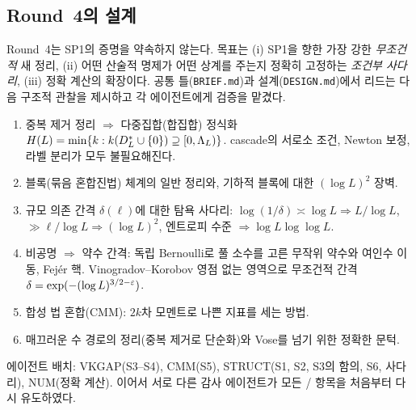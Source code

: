\subsection{Round~4의 설계}
Round~4는 SP1의 증명을 약속하지 않는다. 목표는 (i) SP1을 향한 가장 강한 \emph{무조건적} 새 정리, (ii) 어떤 산술적 명제가 어떤 상계를 주는지 정확히 고정하는 \emph{조건부 사다리}, (iii) 정확 계산의 확장이다. 공통 틀(\texttt{BRIEF.md})과 설계(\texttt{DESIGN.md})에서 리드는 다음 구조적 관찰을 제시하고 각 에이전트에게 검증을 맡겼다.
\begin{enumerate}[label=S\arabic*., leftmargin=2.2em]
\item 중복 제거 정리 $\Rightarrow$ 다중집합(합집합) 정식화 $H(L)=\min\{k:k(D_L^*\cup\{0\})\supseteq[0,\Lambda_L)\}$. cascade의 서로소 조건, Newton 보정, 라벨 분리가 모두 불필요해진다.
\item 블록(묶음 혼합진법) 체계의 일반 정리와, 기하적 블록에 대한 $(\log L)^2$ 장벽.
\item 규모 의존 간격 $\delta(\ell)$에 대한 탐욕 사다리: $\log(1/\delta)\asymp\log L\Rightarrow L/\log L$, $\gg\ell/\log L\Rightarrow(\log L)^2$, 엔트로피 수준 $\Rightarrow\log L\log\log L$.
\item 비공명 $\Rightarrow$ 약수 간격: 독립 Bernoulli로 풀 소수를 고른 무작위 약수와 여인수 이동, Fejér 핵. Vinogradov--Korobov 영점 없는 영역으로 무조건적 간격 $\delta=\exp(-(\log L)^{3/2-\varepsilon})$.
\item 합성 법 혼합(CMM): $2k$차 모멘트로 나쁜 지표를 세는 방법.
\item 매끄러운 수 경로의 정리(중복 제거로 단순화)와 Vose를 넘기 위한 정확한 문턱.
\end{enumerate}
에이전트 배치: VKGAP(S3--S4), CMM(S5), STRUCT(S1, S2, S3의 함의, S6, 사다리), NUM(정확 계산). 이어서 서로 다른 감사 에이전트가 모든 \PROVED{}/\REFUTED{} 항목을 처음부터 다시 유도하였다.
